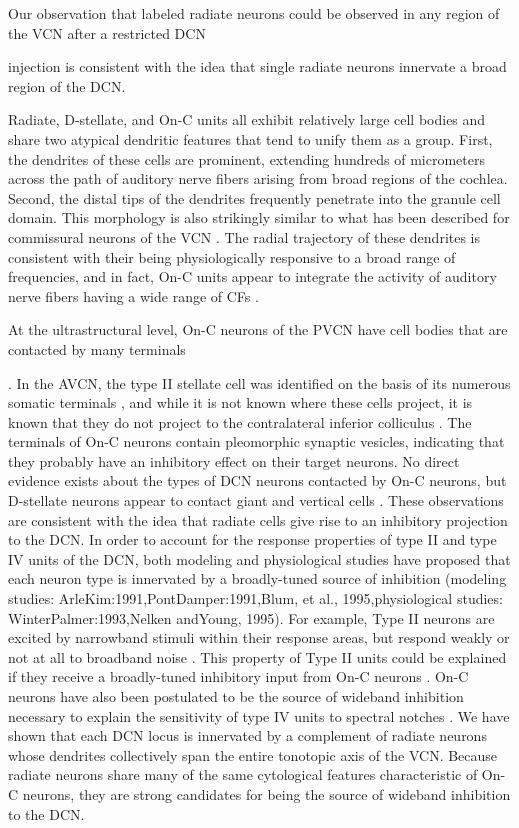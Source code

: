 \documentclass[10pt,a4paper]{article}
\begin{document}
Our observation that labeled radiate neurons could be observed in any region of
the VCN after a restricted DCN

injection is consistent with the idea that single radiate neurons innervate a
broad region of the DCN.

Radiate, D-stellate, and On-C units all exhibit relatively large cell bodies and
share two atypical dendritic features that tend to unify them as a group. First,
the dendrites of these cells are prominent, extending hundreds of micrometers
across the path of auditory nerve fibers arising from broad regions of the
cochlea. Second, the distal tips of the dendrites frequently penetrate into the
granule cell domain. This morphology is also strikingly similar to what has been
described for commissural neurons of the VCN \citep{SchofieldCant:1996}. The
radial trajectory of these dendrites is consistent with their being
physiologically responsive to a broad range of frequencies, and in fact, On-C
units appear to integrate the activity of auditory nerve fibers having a wide
range of CFs
\citep{RhodeSmith:1986,WinterPalmer:1995,JiangPalmerEtAl:1996,PalmerWallaceEtAl:1996}.

At the ultrastructural level, On-C neurons of the PVCN have cell bodies that are
contacted by many terminals

\citep{SmithRhode:1989}. In the AVCN, the type II stellate cell was identified
on the basis of its numerous somatic terminals \citep{Cant:1981}, and while it
is not known where these cells project, it is known that they do not project to
the contralateral inferior colliculus \citep{Cant:1982}. The terminals of On-C
neurons contain pleomorphic synaptic vesicles, indicating that they probably
have an inhibitory effect on their target neurons. No direct evidence exists
about the types of DCN neurons contacted by On-C neurons, but D-stellate neurons
appear to contact giant and vertical cells \citep{ZhangOertel:1993a,b}. These
observations are consistent with the idea that radiate cells give rise to an
inhibitory projection to the DCN. In order to account for the response
properties of type II and type IV units of the DCN, both modeling and
physiological studies have proposed that each neuron type is innervated by a
broadly-tuned source of inhibition (modeling studies:
ArleKim:1991,PontDamper:1991,Blum, et al., 1995,physiological studies:
WinterPalmer:1993,Nelken andYoung, 1995).  For example, Type II neurons are
excited by narrowband stimuli within their response areas, but respond weakly or
not at all to broadband noise \citep{YoungBrownell:1976}. This property of Type
II units could be explained if they receive a broadly-tuned inhibitory input
from On-C neurons \citep{WinterPalmer:1993}. On-C neurons have also been
postulated to be the source of wideband inhibition necessary to explain the
sensitivity of type IV units to spectral notches \citep{NelkenYoung:1995}. We
have shown that each DCN locus is innervated by a complement of radiate neurons
whose dendrites collectively span the entire tonotopic axis of the VCN. Because
radiate neurons share many of the same cytological features characteristic of
On-C neurons, they are strong candidates for being the source of wideband
inhibition to the DCN.
\end{document}
